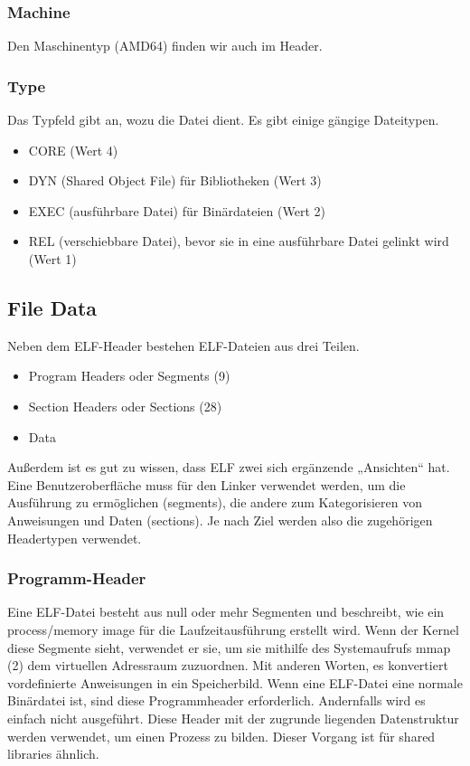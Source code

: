 \subsubsection{Machine}
Den Maschinentyp (AMD64) finden wir auch im Header.

\subsubsection{Type}
Das Typfeld gibt an, wozu die Datei dient. Es gibt einige gängige Dateitypen.

\begin{itemize}
\item CORE (Wert 4)
\item DYN (Shared Object File) für Bibliotheken (Wert 3)
\item EXEC (ausführbare Datei) für Binärdateien (Wert 2)
\item REL (verschiebbare Datei), bevor sie in eine ausführbare Datei gelinkt wird (Wert 1)
\end{itemize}

\subsection{File Data}
Neben dem ELF-Header bestehen ELF-Dateien aus drei Teilen.

\begin{itemize}
\item Program Headers oder Segments (9)
\item Section Headers oder Sections (28)
\item Data
\end{itemize}

Außerdem ist es gut zu wissen, dass ELF zwei sich ergänzende „Ansichten“ hat. Eine Benutzeroberfläche muss für den Linker verwendet werden, um die Ausführung zu ermöglichen (segments), die andere zum Kategorisieren von Anweisungen und Daten (sections). Je nach Ziel werden also die zugehörigen Headertypen verwendet.

\subsubsection{Programm-Header}
Eine ELF-Datei besteht aus null oder mehr Segmenten und beschreibt, wie ein process/memory image für die Laufzeitausführung erstellt wird. Wenn der Kernel diese Segmente sieht, verwendet er sie, um sie mithilfe des Systemaufrufs mmap (2) dem virtuellen Adressraum zuzuordnen. Mit anderen Worten, es konvertiert vordefinierte Anweisungen in ein Speicherbild. Wenn eine ELF-Datei eine normale Binärdatei ist, sind diese Programmheader erforderlich. Andernfalls wird es einfach nicht ausgeführt. Diese Header mit der zugrunde liegenden Datenstruktur werden verwendet, um einen Prozess zu bilden. Dieser Vorgang ist für shared libraries ähnlich.

